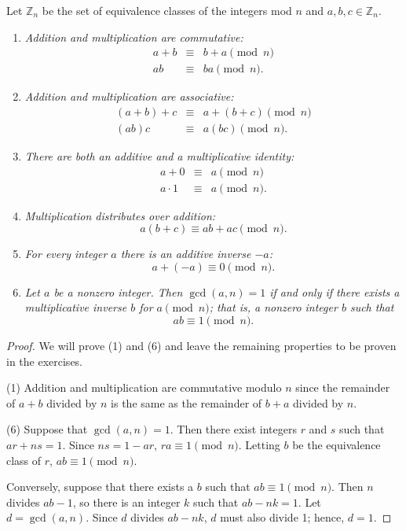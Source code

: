 \begin{proposition}\label{Zn_equiv_classes}
Let ${\mathbb Z}_n$ be the set of equivalence classes of the integers mod $n$ and $a, b, c \in {\mathbb Z}_n$.
\begin{enumerate}
 
\rm \item \it %
Addition and multiplication are commutative:
\begin{eqnarray*}
a + b  & \equiv & b + a \pmod{ n} \\
a  b   & \equiv & b  a \pmod{ n}.
\end{eqnarray*}
 
\rm \item \it %
Addition and multiplication are associative:
\begin{eqnarray*}
(a + b) + c  & \equiv & a + (b + c) \pmod{ n} \\
(a  b)  c    & \equiv & a   (b  c)
\pmod{ n}.
\end{eqnarray*}
 
\rm \item \it %
There are both an additive and a multiplicative identity:
\begin{eqnarray*}
a + 0  & \equiv & a \pmod{ n} \\
a \cdot  1  & \equiv & a \pmod{ n}.
\end{eqnarray*} 
 
\rm \item \it %
Multiplication distributes over addition:
\[
a  (b  + c)  \equiv a  b + a  c  \pmod{ n}.
\]
 
\rm \item \it %
For every integer $a$ there is an additive inverse $-a$:
\[
a + (-a)  \equiv 0 \pmod{ n}.
\]
 
\rm \item \it %
Let $a$ be a nonzero integer.  Then $\gcd(a,n) = 1$ if and only if there exists a multiplicative inverse $b$ for $a \pmod{n}$; that is, a nonzero integer $b$ such that
\[
a  b  \equiv 1 \pmod{ n}.
\]
 
\end{enumerate}
\end{proposition}
 
\begin{proof}
We will prove (1) and (6) and leave the remaining properties to be proven in the exercises. 

(1)
Addition and multiplication are commutative modulo $n$ since the remainder of $a + b$ divided by $n$ is the same as the remainder of $b + a$ divided by $n$. 
 
(6)
Suppose that $\gcd(a, n) = 1$.  Then there exist integers $r$ and $s$ such that $ar + ns = 1$.  Since $ns = 1 - ar$, $ra  \equiv 1 \pmod{n}$.  Letting $b$ be the equivalence class of $r$, $a b \equiv 1\pmod{n}$. 
 
Conversely, suppose that there exists a $b$ such that $ab  \equiv 1 \pmod{ n}$.  Then $n$ divides $ab -1$, so there is an integer $k$ such that $ab - nk = 1$.  Let $d = \gcd(a,n)$.  Since $d$ divides $ab - nk$, $d$ must also divide 1; hence, $d = 1$.
\mbox{\hspace*{1in}}
\end{proof}
 
